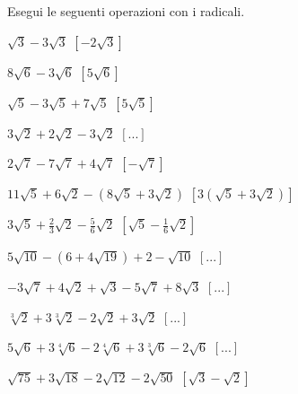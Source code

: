 \subsubsection*{}

\begin{esercizio}[\Ast]
 \label{ese:2.50}
Esegui le seguenti operazioni con i radicali.
 \begin{multicols}{2}
 \begin{enumeratea}
 \item $\sqrt 3-3\sqrt 3$
  \hfill $\left[-2 \sqrt{3}\right]$
 \item $8\sqrt 6-3\sqrt 6$
  \hfill $\left[5\sqrt 6\right]$
 \item $\sqrt 5-3\sqrt 5+7\sqrt 5$
  \hfill $\left[5 \sqrt{5}\right]$
 \item $3\sqrt 2+2\sqrt 2-3\sqrt 2$
  \hfill $\left[...\right]$
 \item $2\sqrt 7-7\sqrt 7+4\sqrt 7$
  \hfill $\left[-\sqrt 7\right]$
 \item $11\sqrt 5+6\sqrt 2-(8\sqrt 5+3\sqrt 2)$
  \hfill $\left[3(\sqrt 5+3\sqrt 2)\right]$
 \item $3\sqrt 5+\frac 2 3\sqrt 2-\frac 5 6\sqrt 2$
  \hfill $\left[\sqrt 5-\frac 1 6\sqrt 2\right]$
 \item $5\sqrt{10}-\left(6+4\sqrt{19}\right)+2-\sqrt{10}$
  \hfill $\left[...\right]$
 \item $-3\sqrt 7+4\sqrt 2+\sqrt 3-5\sqrt 7+8\sqrt 3$
  \hfill $\left[...\right]$
 \item $\sqrt[3]2+3\sqrt[3]2-2\sqrt 2+3\sqrt 2$
  \hfill $\left[...\right]$
 \item $5\sqrt 6+3\sqrt[4]6-2\sqrt[4]6+3\sqrt[3]6-2\sqrt 6$
  \hfill $\left[...\right]$
 \item $\sqrt{75}+3\sqrt{18}-2\sqrt{12}-2\sqrt{50}$
  \hfill $\left[\sqrt 3-\sqrt 2\right]$
 \end{enumeratea}
 \end{multicols}
\end{esercizio}

